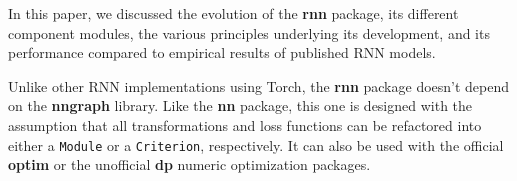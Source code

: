 \documentclass{article} %
\providecommand{\inlinecode}[1]{\texttt{#1}}
\begin{document}
In this paper, we discussed the evolution of the \textbf{rnn} package, its different component
modules, the various principles underlying its development, and its performance
compared to empirical results of published RNN models.

Unlike other RNN implementations using Torch, the \textbf{rnn} package 
doesn't depend on the \textbf{nngraph} library.
Like the \textbf{nn} package, this one is designed with the assumption that all
transformations and loss functions can be refactored 
into either a \inlinecode{Module} or a \inlinecode{Criterion}, respectively.
It can also be used with the official \textbf{optim} 
or the unofficial \textbf{dp} numeric optimization packages.



\end{document}
